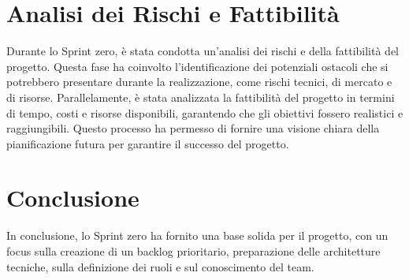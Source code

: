 \documentclass{article}
\begin{document}
\section{Analisi dei Rischi e Fattibilità}
Durante lo Sprint zero, è stata condotta un'analisi dei rischi e della fattibilità del progetto. Questa fase ha coinvolto l'identificazione dei potenziali ostacoli che si potrebbero presentare durante la realizzazione, come rischi tecnici, di mercato e di risorse. Parallelamente, è stata analizzata la fattibilità del progetto in termini di tempo, costi e risorse disponibili, garantendo che gli obiettivi fossero realistici e raggiungibili. Questo processo ha permesso di fornire una visione chiara della pianificazione futura per garantire il successo del progetto.


\section{Conclusione}
In conclusione, lo Sprint zero ha fornito una base solida per il progetto, con un focus sulla creazione di un backlog prioritario, preparazione delle architetture tecniche, sulla definizione dei ruoli e sul conoscimento del team.
\end{document}

